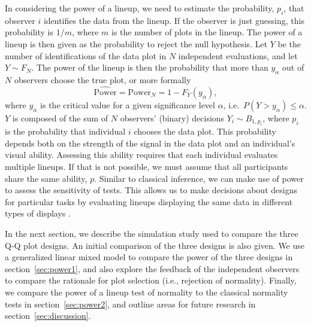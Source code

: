 \documentclass{article}\usepackage[]{graphicx}\usepackage[]{color}
\begin{document}
In considering the power of a lineup, we need to estimate the probability, $p_i$, that observer $i$ identifies the data from the lineup. If the observer is just guessing, this probability is $1/m$, where $m$ is the number of plots in the lineup.
The power of a lineup is then given as the probability to reject the null hypothesis. Let $Y$ be the number of identifications of the data plot in $N$ independent evaluations, and let $Y \sim F_N$. The power of the lineup is then the probability that more than $y_\alpha$ out of $N$ observers
choose the true plot, or more formally
\begin{equation}\label{eqn:power}
\widehat{\text{Power}} = \text{Power}_{N} = 1 - F_{Y} (y_{\alpha}),
\end{equation}
where $y_\alpha$ is the critical value for a given significance level $\alpha$, i.e.~$P(Y >  y_{\alpha}) \le \alpha$. $Y$ is composed of the sum of $N$ observers' (binary) decisions $Y_i \sim B_{1, p_i}$, where  $p_i$ is the probability that individual $i$ chooses the data plot. This probability  depends both on the strength of the signal in the data plot and an individual's visual ability.
Assessing this ability requires that each individual evaluates multiple lineups. 
If that is not possible, we must assume that all participants share the same ability, $p$. %
Similar to classical inference, we can make use of power to assess the sensitivity of tests. This allows us to make decisions about designs for particular tasks by evaluating lineups displaying  the same data in different types of displays \citep{Hofmann:2012ts}. 

In the next section, we describe the simulation study used to compare the three Q-Q plot designs. An initial comparison of the three designs is also given. We use a generalized linear mixed model to compare the power of the three designs in section~\ref{sec:power1}, and also explore the feedback of the independent observers to compare the rationale for plot selection (i.e., rejection of normality). Finally, we compare the power of a lineup test of normality to the classical normality tests in section~\ref{sec:power2}, and outline areas for future research in section~\ref{sec:discussion}. 


\end{document}
